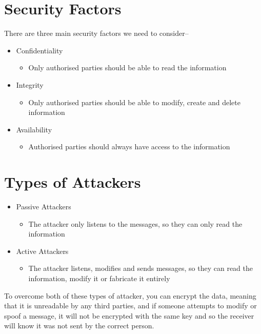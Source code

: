 
\section*{Security Factors}

There are three main security factors we need to consider--
\begin{itemize}
  \item Confidentiality
  \begin{itemize}
    \item Only authorised parties should be able to read the information
  \end{itemize}
  \item Integrity
  \begin{itemize}
    \item Only authorised parties should be able to modify, create and delete information
  \end{itemize}
  \item Availability
  \begin{itemize}
    \item Authorised parties should always have access to the information
  \end{itemize}
\end{itemize}

\section*{Types of Attackers}

\begin{itemize}
  \item Passive Attackers
  \begin{itemize}
    \item The attacker only listens to the messages, so they can only read the information
  \end{itemize}
  \item Active Attackers
  \begin{itemize}
    \item The attacker listens, modifies and sends messages, so they can read the information, modify it or fabricate
     it entirely
  \end{itemize}
\end{itemize}

To overcome both of these types of attacker, you can encrypt the data, meaning that it is unreadable by any third parties,
 and if someone attempts to modify or spoof a message, it will not be encrypted with the same key and so the receiver
 will know it was not sent by the correct person.


